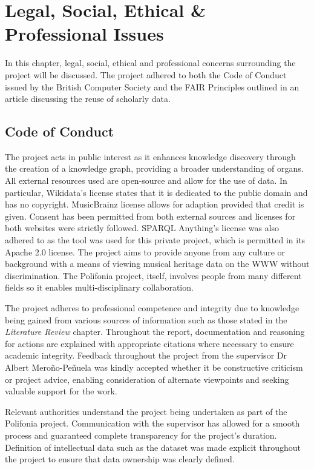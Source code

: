 \chapter{Legal, Social, Ethical \& Professional Issues} 
In this chapter, legal, social, ethical and professional concerns surrounding the project will be discussed. The project adhered to both the Code of Conduct issued by the British Computer Society \cite{bcs} and the FAIR Principles \cite{fairprinciples} outlined in an article discussing the reuse of scholarly data.
                                                      
\section{Code of Conduct}
\hspace{0.5cm} The project acts in public interest as it enhances knowledge discovery through the creation of a knowledge graph, providing a broader understanding of organs. All external resources used are open-source and allow for the use of data. In particular, Wikidata's license \cite{wikidatalicense} states that it is dedicated to the public domain and has no copyright. MusicBrainz license \cite{musicbrainzlicense} allows for adaption provided that credit is given. Consent has been permitted from both external sources and licenses for both websites were strictly followed. SPARQL Anything's license \cite{apachelicense} was also adhered to as the tool was used for this private project, which is permitted in its Apache 2.0 license. The project aims to provide anyone from any culture or background with a means of viewing musical heritage data on the WWW without discrimination. The Polifonia project, itself, involves people from many different fields so it enables multi-disciplinary collaboration. 

The project adheres to professional competence and integrity due to knowledge being gained from various sources of information such as those stated in the \textit{Literature Review} chapter. Throughout the report, documentation and reasoning for actions are explained with appropriate citations where necessary to ensure academic integrity. Feedback throughout the project from the supervisor Dr Albert Mero{\~n}o-Pe{\~n}uela was kindly accepted whether it be constructive criticism or project advice, enabling consideration of alternate viewpoints and seeking valuable support for the work.

Relevant authorities understand the project being undertaken as part of the Polifonia project. Communication with the supervisor has allowed for a smooth process and guaranteed complete transparency for the project's duration. Definition of intellectual data such as the dataset was made explicit throughout the project to ensure that data ownership was clearly defined.

